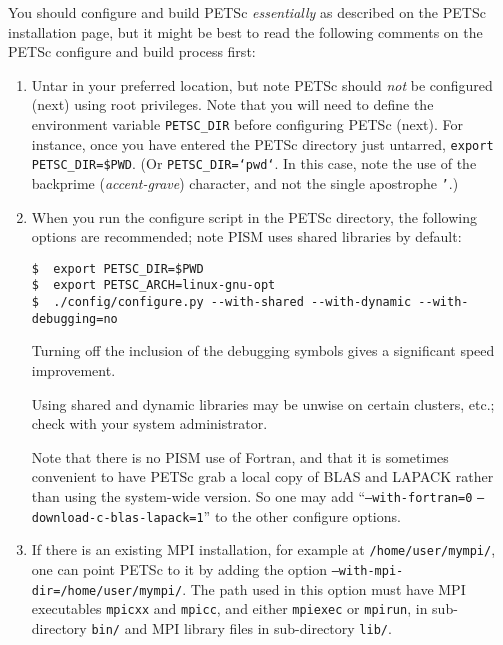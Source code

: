 \documentclass[11pt,final]{amsart}
\newcommand{\und}{\_\!\_}
\begin{document}
\begin{enumerate}
You should configure and build PETSc \emph{essentially} as described on the PETSc installation page, but it might be best to read the following comments on the PETSc configure and build process first:

\renewcommand{\labelenumii}{(\roman{enumii})}\begin{enumerate}
\item Untar in your preferred location, but note PETSc should \emph{not} be configured (next) using root privileges.  Note that you will need to define the environment variable \texttt{PETSC_DIR}\index{PETSC\und DIR} before configuring PETSc (next).  For instance, once you have entered the PETSc directory just untarred, \texttt{export PETSC_DIR=\$PWD}. (Or \texttt{PETSC_DIR=`pwd`}.  In this case, note the use of the backprime (\emph{accent-grave}) character, and not the single apostrophe \texttt{'}.)

\item When you run the configure script in the PETSc directory, the following options are recommended; note PISM uses shared libraries by default:\index{PETSC\und ARCH}
\begin{verbatim}
$  export PETSC_DIR=$PWD
$  export PETSC_ARCH=linux-gnu-opt
$  ./config/configure.py --with-shared --with-dynamic --with-debugging=no
\end{verbatim}

Turning off the inclusion of the debugging symbols gives a significant speed improvement.

Using shared and dynamic libraries may be unwise on certain clusters, etc.; check with your system administrator.

Note that there is no PISM use of Fortran, and that it is sometimes convenient to have PETSc grab a local copy of BLAS and LAPACK rather than using the system-wide version.  So one may add ``\texttt{--with-fortran=0} \texttt{--download-c-blas-lapack=1}'' to the other configure options.

\item If there is an existing MPI installation, for example at \texttt{/home/user/mympi/}, one can point PETSc to it by adding the option \texttt{--with-mpi-dir=/home/user/mympi/}.  The path used in this option must have MPI executables \texttt{mpicxx} and \texttt{mpicc}, and either \texttt{mpiexec} or \texttt{mpirun}, in sub-directory \texttt{bin/} and MPI library files in sub-directory \texttt{lib/}.


\end{enumerate}
\end{enumerate}
\end{document}
